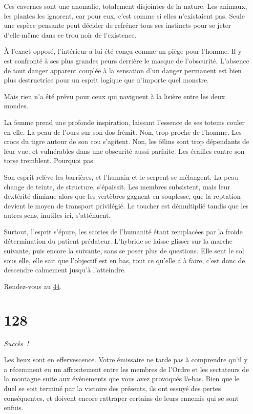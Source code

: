 \documentclass{report}
\newcommand{\gsection}[1]{
    \section{#1}
    \label{section-#1}
}
\newcommand{\glink}[1]{\hyperref[section-#1]{#1}}
\newcommand{\success}{\emph{Succès !}}
\begin{document}
Ces cavernes sont une anomalie, totalement disjointes de la nature. Les animaux, les plantes les ignorent, car pour eux, c'est comme si elles n'existaient pas. Seule une espèce pensante peut décider de refréner tous ses instincts pour se jeter d'elle-même dans ce trou noir de l'existence.

À l'exact opposé, l'intérieur a lui été conçu comme un piège pour l'homme. Il y est confronté à ses plus grandes peurs derrière le masque de l'obscurité. L'absence de tout danger apparent couplée à la sensation d'un danger permanent est bien plus destructrice pour un esprit logique que n'importe quel monstre.

Mais rien n'a été prévu pour ceux qui naviguent à la lisière entre les deux mondes.

La femme prend une profonde inspiration, laissant l'essence de ses totems couler en elle. La peau de l'ours sur son dos frémit. Non, trop proche de l'homme. Les crocs du tigre autour de son cou s'agitent. Non, les félins sont trop dépendants de leur vue, et vulnérables dans une obscurité aussi parfaite. Les écailles contre son torse tremblent. Pourquoi pas.

Son esprit relève les barrières, et l'humain et le serpent se mélangent. La peau change de teinte, de structure, s'épaissit. Les membres subsistent, mais leur dextérité diminue alors que les vertèbres gagnent en souplesse, que la reptation devient le moyen de transport privilégié. Le toucher est démultiplié tandis que les autres sens, inutiles ici, s'atténuent.

Surtout, l'esprit s'épure, les scories de l'humanité étant remplacées par la froide détermination du patient prédateur. L'hybride se laisse glisser sur la marche suivante, puis encore la suivante, sans se poser plus de questions. Elle sent le sol sous elle, elle sait que l'objectif est en bas, tout ce qu'elle a à faire, c'est donc de descendre calmement jusqu'à l'atteindre.

Rendez-vous au \glink{44}.

\gsection{128}

\success

Les lieux sont en effervescence. Votre émissaire ne tarde pas à comprendre qu'il y a récemment eu un affrontement entre les membres de l'Ordre et les sectateurs de la montagne suite aux événements que vous avez provoqués là-bas. Bien que le duel se soit terminé par la victoire des présents, ils ont essuyé des pertes conséquentes, et doivent encore rattraper certains de leurs ennemis qui se sont enfuis.
\end{document}
